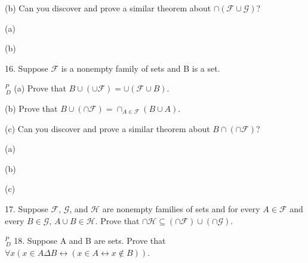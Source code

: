 \documentclass{article}
\begin{document}
\hspace{12pt}(b) Can you discover and prove a similar theorem about $\cap(\mathcal{F} \cup \mathcal{G})$?

\vspace{30pt}

(a)

\vspace{30pt}

(b)

\vspace{30pt}

16. Suppose $\mathcal{F}$ is a nonempty family of sets and B is a set.

\hspace{12pt}$^{\textit{P}}_{\, \textit{D}}$ (a) Prove that $B \cup (\cup\mathcal{F}) = \cup(\mathcal{F} \cup {B})$.

\hspace{12pt}(b) Prove that $B \cup (\cap\mathcal{F}) = \cap_{A \in \mathcal{F}} (B \cup A)$.

\hspace{12pt}(c) Can you discover and prove a similar theorem about $B \cap (\cap \mathcal{F} )$?

\vspace{30pt}

(a)

\vspace{30pt}

(b)

\vspace{30pt}

(c)

\vspace{30pt}

17. Suppose $\mathcal{F}$, $\mathcal{G}$, and $\mathcal{H}$ are nonempty families of sets and for every $A \in \mathcal{F}$ and every $B \in \mathcal{G}$, $A \cup B \in \mathcal{H}$. Prove that $\cap\mathcal{H} \subseteq (\cap\mathcal{F}) \cup (\cap\mathcal{G})$.

\vspace{30pt}



\vspace{30pt}

$^{\textit{P}}_{\, \textit{D}}$ 18. Suppose A and B are sets. Prove that $\forall x(x \in A \Delta B \leftrightarrow (x \in A \leftrightarrow x \notin B))$.

\vspace{30pt}
\end{document}
